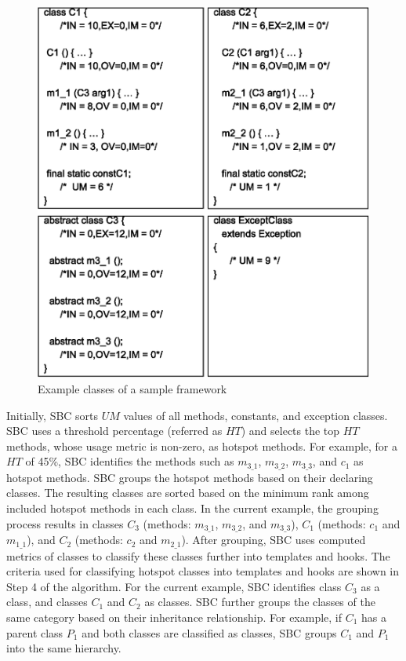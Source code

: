\begin{figure}[t]
\centering
\includegraphics[scale=0.43,clip]{figs/Approach_Example1.eps}
\caption{Example classes of a sample framework} \label{fig:frameworkex}
\end{figure}

Initially, SBC sorts $UM$ values of all methods, constants, and
exception classes. 
SBC uses a threshold percentage (referred as $HT$) and selects the
top $HT$ methods, whose usage metric is non-zero, as hotspot methods. For example, for a $HT$ of 45\%,
SBC identifies the methods such as $m_{3\_1}$, $m_{3\_2}$, $m_{3\_3}$, and $c_1$ as hotspot
methods. SBC groups the hotspot methods based on their declaring classes. 
The resulting classes are sorted based on the minimum rank among included hotspot methods in each class.
In the current example, the grouping process results in 
classes $C_3$ (methods: $m_{3\_1}$, $m_{3\_2}$, and $m_{3\_3}$), 
$C_1$ (methods: $c_1$ and $m_{1\_1}$), and $C_2$ (methods: $c_2$ and $m_{2\_1}$).
After grouping, SBC uses computed metrics of classes
to classify these classes further into templates and hooks. The criteria
used for classifying hotspot classes into templates and hooks are shown in Step 4 of the algorithm.
For the current example, SBC identifies class $C_3$ as a  class, and classes
$C_1$ and $C_2$ as  classes. SBC further 
groups the classes of the same category based on their inheritance relationship. For example,
if $C_1$ has a parent class $P_1$ and both classes are classified as  classes,
SBC groups $C_1$ and $P_1$ into the same hierarchy.

